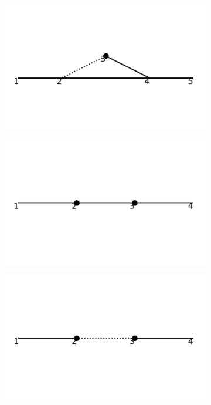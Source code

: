 \documentclass[11pt,a4paper,twoside,pdf]{article}
\numberwithin{equation}{section}
\begin{document}
\begin{figure}[h!]
\begin{subfigure}[t]{0.19\textwidth}
        \caption{ }
    \end{subfigure}
    \begin{subfigure}[t]{0.19\textwidth}
        \centering
        \includegraphics[width=\textwidth]{plots/order4_1to1/counterterms/3.png}
        \caption{ }
        
    \end{subfigure}
    \begin{subfigure}[t]{0.19\textwidth}
        \centering
        \includegraphics[width=\textwidth]{plots/order4_1to1/counterterms/4.png}
        \caption{ }
        
    \end{subfigure}
    \begin{subfigure}[t]{0.19\textwidth}
        \centering
        \includegraphics[width=\textwidth]{plots/order4_1to1/counterterms/5.png}
        \caption{ }
        

\end{subfigure}
\end{figure}
\end{document}
